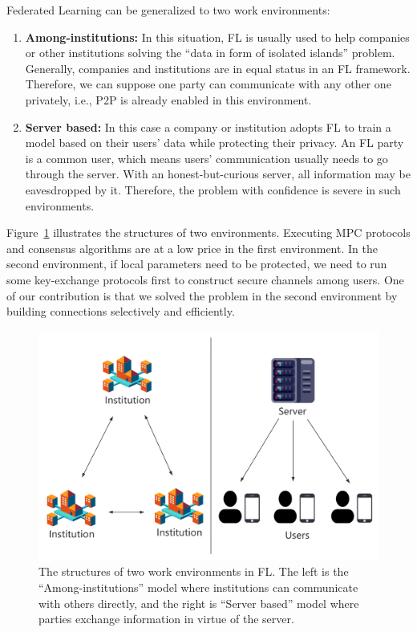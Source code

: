 Federated Learning can be generalized to two work environments:

\begin{enumerate}

    \item \textbf{Among-institutions:} In this situation, FL is usually used to help companies or other institutions solving the ``data in form of isolated islands'' problem. Generally, companies and institutions are in equal status in an FL framework. Therefore, we can suppose one party can communicate with any other one privately, i.e., P2P is already enabled in this environment.

    \item \textbf{Server based:} In this case a company or institution adopts FL to train a model based on their users' data while protecting their privacy. An FL party is a common user, which means users' communication usually needs to go through the server. With an honest-but-curious server, all information may be eavesdropped by it. Therefore, the problem with confidence is severe in such environments.

\end{enumerate}

Figure~\ref{fl_model} illustrates the structures of two environments. Executing MPC protocols and consensus algorithms are at a low price in the first environment. In the second environment, if local parameters need to be protected, we need to run some key-exchange protocols first to construct secure channels among users. One of our contribution is that we solved the problem in the second environment by building connections selectively and efficiently.


\begin{figure}[!ht]
    \centering
    \includegraphics[width=\columnwidth]{img/fl_model.png}
    \caption{The structures of two work environments in FL. The left is the ``Among-institutions'' model where institutions can communicate with others directly, and the right is ``Server based'' model where parties exchange information in virtue of the server.}
    \label{fl_model}
\end{figure}


